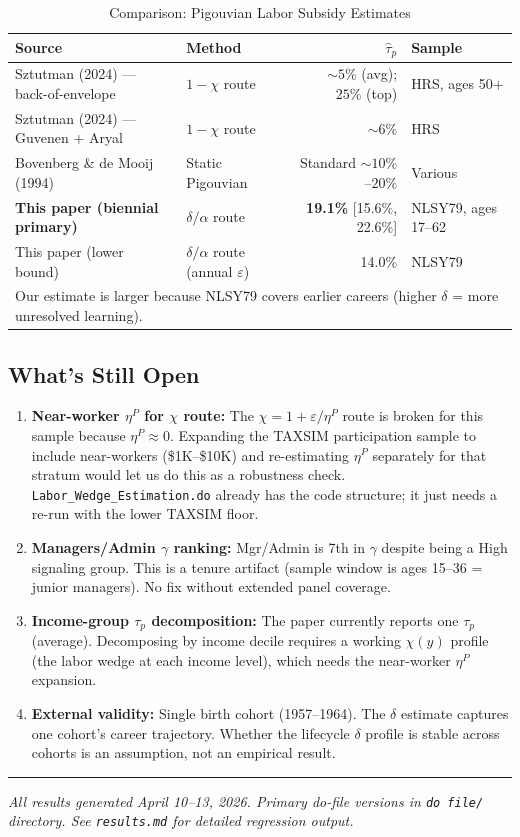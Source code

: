 \documentclass[11pt, letterpaper]{article}
\newcommand{\dofile}[1]{\texttt{#1}}
\begin{document}
\begin{table}[h!]
\centering
\caption{Comparison: Pigouvian Labor Subsidy Estimates}
\label{tab:tau_lit}
\begin{tabular}{llrl}
\toprule
Source & Method & $\hat{\tau}_p$ & Sample \\
\midrule
Sztutman (2024) --- back-of-envelope & $1 - \chi$ route & $\sim 5\%$ (avg); $25\%$ (top) & HRS, ages 50+ \\
Sztutman (2024) --- Guvenen + Aryal & $1 - \chi$ route & $\sim 6\%$ & HRS \\
Bovenberg \& de Mooij (1994) & Static Pigouvian & Standard $\sim 10\%$--$20\%$ & Various \\
\midrule
\textbf{This paper (biennial primary)} & $\delta/\alpha$ route & \textbf{19.1\%} [15.6\%, 22.6\%] & NLSY79, ages 17--62 \\
This paper (lower bound) & $\delta/\alpha$ route (annual $\varepsilon$) & 14.0\% & NLSY79 \\
\bottomrule
\multicolumn{4}{l}{\footnotesize Our estimate is larger because NLSY79 covers earlier careers (higher $\delta$ = more unresolved learning).}
\end{tabular}
\end{table}

\subsection{What's Still Open}

\begin{enumerate}
    \item \textbf{Near-worker $\eta^P$ for $\chi$ route:} The $\chi = 1 + \varepsilon/\eta^P$ route is broken for this sample because $\eta^P \approx 0$. Expanding the TAXSIM participation sample to include near-workers (\$1K--\$10K) and re-estimating $\eta^P$ separately for that stratum would let us do this as a robustness check. \dofile{Labor\_Wedge\_Estimation.do} already has the code structure; it just needs a re-run with the lower TAXSIM floor.

    \item \textbf{Managers/Admin $\gamma$ ranking:} Mgr/Admin is 7th in $\gamma$ despite being a High signaling group. This is a tenure artifact (sample window is ages 15--36 = junior managers). No fix without extended panel coverage.

    \item \textbf{Income-group $\tau_p$ decomposition:} The paper currently reports one $\tau_p$ (average). Decomposing by income decile requires a working $\chi(y)$ profile (the labor wedge at each income level), which needs the near-worker $\eta^P$ expansion.

    \item \textbf{External validity:} Single birth cohort (1957--1964). The $\delta$ estimate captures one cohort's career trajectory. Whether the lifecycle $\delta$ profile is stable across cohorts is an assumption, not an empirical result.
\end{enumerate}

\vspace{12pt}
\hrule
\vspace{6pt}
\begin{center}
\textit{All results generated April 10--13, 2026. Primary do-file versions in \texttt{do file/} directory. See \texttt{results.md} for detailed regression output.}
\end{center}
\end{document}

